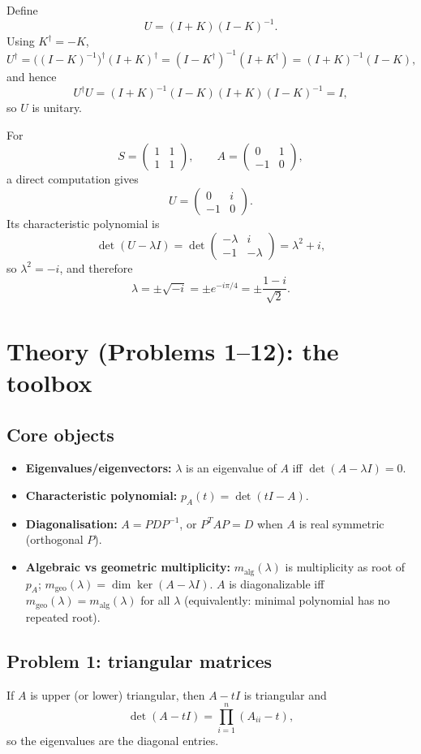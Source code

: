 \documentclass[12pt,a4paper]{article}
\theoremstyle{plain}
\theoremstyle{definition}      %
\begin{document}
Define
\[
U=(I+K)(I-K)^{-1}.
\]
Using $K^\dagger=-K$,
\[
U^\dagger=\bigl((I-K)^{-1}\bigr)^\dagger (I+K)^\dagger
=(I-K^\dagger)^{-1}(I+K^\dagger)
=(I+K)^{-1}(I-K),
\]
and hence
\[
U^\dagger U=(I+K)^{-1}(I-K)(I+K)(I-K)^{-1}=I,
\]
so $U$ is unitary.

For
\[
S=\begin{pmatrix}1&1\\1&1\end{pmatrix},\qquad
A=\begin{pmatrix}0&1\\-1&0\end{pmatrix},
\]
a direct computation gives
\[
U=\begin{pmatrix}0&i\\-1&0\end{pmatrix}.
\]
Its characteristic polynomial is
\[
\det(U-\lambda I)=\det\begin{pmatrix}-\lambda&i\\-1&-\lambda\end{pmatrix}
=\lambda^2+i,
\]
so $\lambda^2=-i$, and therefore
\[
\lambda=\pm \sqrt{-i}=\pm e^{-i\pi/4}=\pm\frac{1-i}{\sqrt2}.
\]

\section*{Theory (Problems 1--12): the toolbox}

\subsection*{Core objects}
\begin{itemize}
	\item \textbf{Eigenvalues/eigenvectors:} $\lambda$ is an eigenvalue of $A$ iff $\det(A-\lambda I)=0$.
	\item \textbf{Characteristic polynomial:} $p_A(t)=\det(tI-A)$.
	\item \textbf{Diagonalisation:} $A=PDP^{-1}$, or $P^TAP=D$ when $A$ is real symmetric (orthogonal $P$).
	\item \textbf{Algebraic vs geometric multiplicity:}
	$m_{\text{alg}}(\lambda)$ is multiplicity as root of $p_A$; $m_{\text{geo}}(\lambda)=\dim\ker(A-\lambda I)$.
	$A$ is diagonalizable iff $m_{\text{geo}}(\lambda)=m_{\text{alg}}(\lambda)$ for all $\lambda$
	(equivalently: minimal polynomial has no repeated root).
\end{itemize}

\subsection*{Problem 1: triangular matrices}
If $A$ is upper (or lower) triangular, then $A-tI$ is triangular and
\[
\det(A-tI)=\prod_{i=1}^n (A_{ii}-t),
\]
so the eigenvalues are the diagonal entries.
\end{document}
